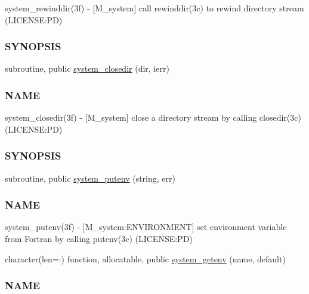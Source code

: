\begin{DoxyCompactItemize}
\begin{DoxyCompactList}
system\+\_\+rewinddir(3f) -\/ \mbox{[}M\+\_\+system\mbox{]} call rewinddir(3c) to rewind directory stream (L\+I\+C\+E\+N\+SE\+:PD) \subsubsection*{S\+Y\+N\+O\+P\+S\+IS}\end{DoxyCompactList}\item 
subroutine, public \mbox{\hyperlink{namespacem__system_acd442b52c64fc50482bc08b0ac8a50d1}{system\+\_\+closedir}} (dir, ierr)
\begin{DoxyCompactList}\small\item\em \subsubsection*{N\+A\+ME}

system\+\_\+closedir(3f) -\/ \mbox{[}M\+\_\+system\mbox{]} close a directory stream by calling closedir(3c) (L\+I\+C\+E\+N\+SE\+:PD) \subsubsection*{S\+Y\+N\+O\+P\+S\+IS}\end{DoxyCompactList}\item 
subroutine, public \mbox{\hyperlink{namespacem__system_af0c9df8e59cac9cd617cd1e20448ea7d}{system\+\_\+putenv}} (string, err)
\begin{DoxyCompactList}\small\item\em \subsubsection*{N\+A\+ME}

system\+\_\+putenv(3f) -\/ \mbox{[}M\+\_\+system\+:E\+N\+V\+I\+R\+O\+N\+M\+E\+NT\mbox{]} set environment variable from Fortran by calling putenv(3c) (L\+I\+C\+E\+N\+SE\+:PD) \end{DoxyCompactList}\item 
character(len=\+:) function, allocatable, public \mbox{\hyperlink{namespacem__system_a0f91f973a4288ebda0e75ea0869a43af}{system\+\_\+getenv}} (name, default)
\begin{DoxyCompactList}\small\item\em \subsubsection*{N\+A\+ME}


\end{DoxyCompactList}
\end{DoxyCompactItemize}
